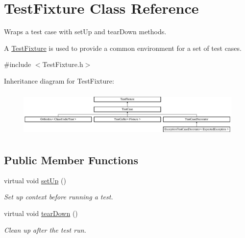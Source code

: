 \hypertarget{class_test_fixture}{}\section{Test\+Fixture Class Reference}
\label{class_test_fixture}


Wraps a test case with set\+Up and tear\+Down methods.

A \hyperlink{class_test_fixture}{Test\+Fixture} is used to provide a common environment for a set of test cases.  




{\ttfamily \#include $<$Test\+Fixture.\+h$>$}

Inheritance diagram for Test\+Fixture\+:\begin{figure}[H]
\begin{center}
\leavevmode
\includegraphics[height=2.370370cm]{class_test_fixture}
\end{center}
\end{figure}
\subsection*{Public Member Functions}
\begin{DoxyCompactItemize}
\item 
virtual void \hyperlink{class_test_fixture_a0e77590b14a3ec7f93fe02e5b89a242f}{set\+Up} ()\hypertarget{class_test_fixture_a0e77590b14a3ec7f93fe02e5b89a242f}{}\label{class_test_fixture_a0e77590b14a3ec7f93fe02e5b89a242f}

\begin{DoxyCompactList}\small\item\em Set up context before running a test. \end{DoxyCompactList}\item 
virtual void \hyperlink{class_test_fixture_a707dd4d7d0910af916343d79c0feffc9}{tear\+Down} ()\hypertarget{class_test_fixture_a707dd4d7d0910af916343d79c0feffc9}{}\label{class_test_fixture_a707dd4d7d0910af916343d79c0feffc9}

\begin{DoxyCompactList}\small\item\em Clean up after the test run. \end{DoxyCompactList}\end{DoxyCompactItemize}


